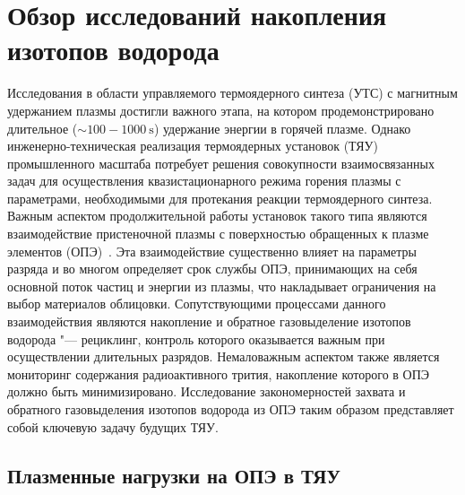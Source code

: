 \chapter{Обзор исследований накопления изотопов водорода }\label{ch:ch1}


Исследования в области управляемого термоядерного синтеза (УТС) с магнитным удержанием плазмы достигли важного этапа, на котором продемонстрировано длительное ($\sim100-\SI{1000}{\second}$) удержание энергии в горячей плазме. Однако инженерно-техническая реализация термоядерных установок (ТЯУ) промышленного масштаба потребует решения совокупности взаимосвязанных задач для осуществления квазистационарного режима горения плазмы с параметрами, необходимыми для протекания реакции термоядерного синтеза. Важным аспектом продолжительной работы установок такого типа являются взаимодействие пристеночной плазмы с поверхностью обращенных к плазме элементов (ОПЭ)~\cite{Krieger2025}. Эта взаимодействие существенно влияет на параметры разряда и во многом определяет срок службы ОПЭ, принимающих на себя основной поток частиц и энергии из плазмы, что накладывает ограничения на выбор материалов облицовки. Сопутствующими процессами данного взаимодействия являются накопление и обратное газовыделение изотопов водорода "--- рециклинг, контроль которого оказывается важным при осуществлении длительных разрядов. Немаловажным аспектом также является мониторинг содержания радиоактивного трития, накопление которого в ОПЭ должно быть минимизировано. Исследование закономерностей захвата и обратного газовыделения изотопов водорода из ОПЭ таким образом представляет собой ключевую задачу будущих ТЯУ.

\section{Плазменные нагрузки на ОПЭ в ТЯУ}\label{sec:ch1/sec1}

